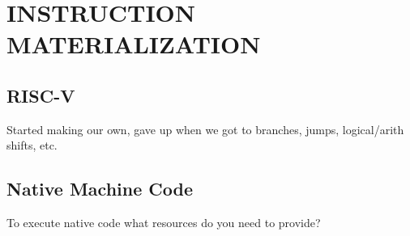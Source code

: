 \chapter{INSTRUCTION MATERIALIZATION}
\label{insn}

\section{RISC-V}
\label{insn:riscv}
Started making our own, gave up when we got to branches, jumps,
logical/arith shifts, etc.

\section{Native Machine Code}
\label{insn:native}
To execute native code what resources do you need to provide?

